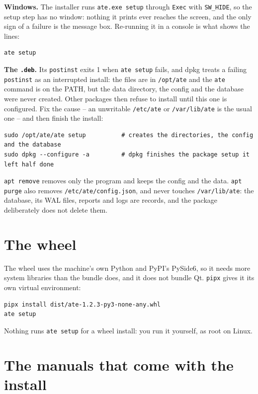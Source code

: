 \textbf{Windows.} The installer runs \texttt{ate.exe setup} through \texttt{Exec} with
\texttt{SW\_HIDE}, so the setup step has no window: nothing it prints ever reaches the screen, and
the only sign of a failure is the message box. Re-running it in a console is what shows the lines:

\begin{lstlisting}[language=ATEShell]
ate setup
\end{lstlisting}

\textbf{The \texttt{.deb}.} Its \texttt{postinst} exits 1 when \texttt{ate setup} fails, and dpkg
treats a failing \texttt{postinst} as an interrupted install: the files are in \texttt{/opt/ate} and
the \texttt{ate} command is on the PATH, but the data directory, the config and the database were
never created. Other packages then refuse to install until this one is configured. Fix the cause --
an unwritable \texttt{/etc/ate} or \texttt{/var/lib/ate} is the usual one -- and then finish the
install:

\begin{lstlisting}[language=ATEShell]
sudo /opt/ate/ate setup          # creates the directories, the config and the database
sudo dpkg --configure -a         # dpkg finishes the package setup it left half done
\end{lstlisting}

\texttt{apt remove} removes only the program and keeps the config and the data. \texttt{apt purge}
also removes \texttt{/etc/ate/config.json}, and never touches \texttt{/var/lib/ate}: the database,
its WAL files, reports and logs are records, and the package deliberately does not delete them.

\section{The wheel}

The wheel uses the machine's own Python and PyPI's PySide6, so it needs more system libraries than
the bundle does, and it does not bundle Qt. \texttt{pipx} gives it its own virtual environment:

\begin{lstlisting}[language=ATEShell]
pipx install dist/ate-1.2.3-py3-none-any.whl
ate setup
\end{lstlisting}

Nothing runs \texttt{ate setup} for a wheel install: you run it yourself, as root on Linux.

\section{The manuals that come with the install}

